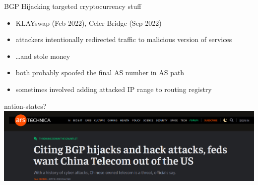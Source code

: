 \begin{frame}{BGP Hijacking targeted cryptocurrency stuff}
    \begin{itemize}
    \item KLAYswap (Feb 2022), Celer Bridge (Sep 2022)
    \item attackers intentionally redirected traffic to malicious version of services
    \item \ldots and stole money
    \vspace{.5cm}
    \item both probably spoofed the final AS number in AS path
    \item sometimes involved adding attacked IP range to routing registry
    \end{itemize}
\end{frame}

\begin{frame}{nation-states?}
\includegraphics[width=\textwidth]{../routing/china-tele-ars-tech}
\end{frame}
